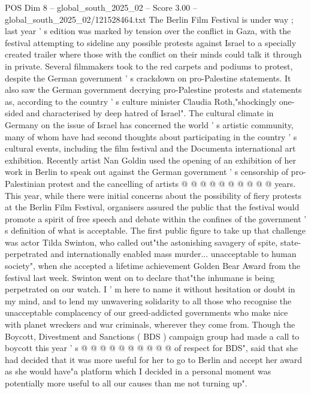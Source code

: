 \begin{textsample}{POS Dim 8 – global\_south\_2025\_02 – Score 3.00 – global\_south\_2025\_02/121528464.txt}  \label{ex:f8_pos_393}
The Berlin Film Festival is under way ; last year ' s edition was marked by tension over the conflict in Gaza, with the festival attempting to sideline any possible protests against Israel to a specially created trailer where those with the conflict on their minds could talk it through in private.
Several filmmakers took to the red carpets and podiums to protest, despite the German government ' s crackdown on pro-Palestine statements.
It also saw the German government decrying pro-Palestine protests and statements as, according to the country ' s culture minister Claudia Roth,"shockingly one-sided and characterised by deep hatred of Israel".
The cultural climate in Germany on the issue of Israel has concerned the world ' s artistic community, many of whom have had second thoughts about participating in the country ' s cultural events, including the film festival and the Documenta international art exhibition.
Recently artist Nan Goldin used the opening of an exhibition of her work in Berlin to speak out against the German government ' s censorship of pro-Palestinian protest and the cancelling of artists @ @ @ @ @ @ @ @ @ @ years.
This year, while there were initial concerns about the possibility of fiery protests at the Berlin Film Festival, organisers assured the public that the festival would promote a spirit of free speech and debate within the confines of the government ' s definition of what is acceptable.
The first public figure to take up that challenge was actor Tilda Swinton, who called out"the astonishing savagery of spite, state-perpetrated and internationally enabled mass murder... unacceptable to human society", when she accepted a lifetime achievement Golden Bear Award from the festival last week.
Swinton went on to declare that"the inhumane is being perpetrated on our watch.
I ' m here to name it without hesitation or doubt in my mind, and to lend my unwavering solidarity to all those who recognise the unacceptable complacency of our greed-addicted governments who make nice with planet wreckers and war criminals, wherever they come from.
Though the Boycott, Divestment and Sanctions ( BDS ) campaign group had made a call to boycott this year ' s @ @ @ @ @ @ @ @ @ @ of respect for BDS", said that she had decided that it was more useful for her to go to Berlin and accept her award as she would have"a platform which I decided in a personal moment was potentially more useful to all our causes than me not turning up".

\end{textsample}
